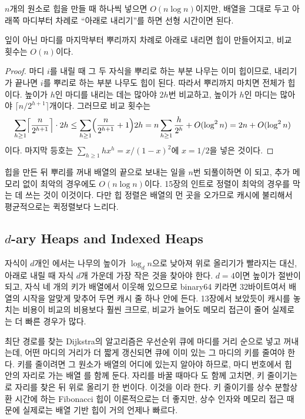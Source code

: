 $n$개의 원소로 힙을 만들 때 하나씩 넣으면 $O(n\log n)$이지만, 배열을 그대로 두고 아래쪽 마디부터 차례로 ``아래로 내리기''를 하면 선형 시간이면 된다\cite{floyd1964treesort}.

\begin{proposition}
\label{prop:heapify}
잎이 아닌 마디를 마지막부터 뿌리까지 차례로 아래로 내리면 힙이 만들어지고, 비교 횟수는 $O(n)$이다.
\end{proposition}

\begin{proof}
마디 $i$를 내릴 때 그 두 자식을 뿌리로 하는 부분 나무는 이미 힙이므로, 내리기가 끝나면 $i$를 뿌리로 하는 부분 나무도 힙이 된다. 따라서 뿌리까지 마치면 전체가 힙이다. 높이가 $h$인 마디를 내리는 데는 많아야 $2h$번 비교하고, 높이가 $h$인 마디는 많아야 $\lceil n/2^{h+1}\rceil$개이다. 그러므로 비교 횟수는
\[
\sum_{h\ge1}\Bigl\lceil\frac n{2^{h+1}}\Bigr\rceil\cdot2h\le\sum_{h\ge1}\Bigl(\frac n{2^{h+1}}+1\Bigr)2h=n\sum_{h\ge1}\frac h{2^h}+O(\log^2n)=2n+O(\log^2n)
\]
이다. 마지막 등호는 $\sum_{h\ge1}h x^h=x/(1-x)^2$에 $x=1/2$을 넣은 것이다.
\end{proof}

힙을 만든 뒤 뿌리를 꺼내 배열의 끝으로 보내는 일을 $n$번 되풀이하면 이 되고\cite{williams1964heapsort}, 추가 메모리 없이 최악의 경우에도 $O(n\log n)$이다. 15장의 인트로 정렬이 최악의 경우를 막는 데 쓰는 것이 이것이다. 다만 힙 정렬은 배열의 먼 곳을 오가므로 캐시에 불리해서 평균적으로는 퀵정렬보다 느리다.

\subsection{$d$-ary Heaps and Indexed Heaps}

자식이 $d$개인 에서는 나무의 높이가 $\log_dn$으로 낮아져 위로 올리기가 빨라지는 대신, 아래로 내릴 때 자식 $d$개 가운데 가장 작은 것을 찾아야 한다\cite{johnson1975dheap}. $d=4$이면 높이가 절반이 되고, 자식 네 개의 키가 배열에서 이웃해 있으므로 binary64 키라면 $32$바이트여서 배열의 시작을 알맞게 맞추어 두면 캐시 줄 하나 안에 든다. 13장에서 보았듯이 캐시를 놓치는 비용이 비교의 비용보다 훨씬 크므로, 비교가 늘어도 메모리 접근이 줄어 실제로는 더 빠른 경우가 많다.

최단 경로를 찾는 Dijkstra의 알고리즘은 우선순위 큐에 마디를 거리 순으로 넣고 꺼내는데\cite{dijkstra1959}, 어떤 마디의 거리가 더 짧게 갱신되면 큐에 이미 있는 그 마디의 키를 줄여야 한다. 키를 줄이려면 그 원소가 배열의 어디에 있는지 알아야 하므로, 마디 번호에서 힙 안의 자리로 가는 배열 를 함께 둔다. 자리를 바꿀 때마다 도 함께 고치면, 키 줄이기는 로 자리를 찾은 뒤 위로 올리기 한 번이다. 이것을 이라 한다. 키 줄이기를 상수 분할상환 시간에 하는 Fibonacci 힙\cite{fredman1987fibonacci}이 이론적으로는 더 좋지만, 상수 인자와 메모리 접근 때문에 실제로는 배열 기반 힙이 거의 언제나 빠르다.

